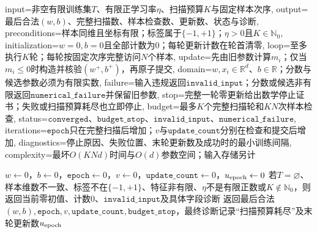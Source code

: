 \begin{AlgorithmContract}{
  input={非空有限训练集$T$、有限正学习率$\eta$、扫描预算$K$与固定样本次序},
  output={最后合法$(w,b)$、完整扫描数、样本检查数、更新数、状态与诊断},
  preconditions={样本同维且坐标有限；标签属于$\{-1,+1\}$；$\eta>0$且$K\in\mathbb N_0$},
  initialization={$w=0,b=0$且全部计数为$0$；每轮更新计数在轮首清零},
  loop={至多执行$K$轮；每轮按固定次序完整访问$N$个样本},
  update={先由旧参数计算$m_i$；仅当$m_i\le0$时构造并核验$(w^+,b^+)$，再原子提交},
  domain={$w,x_i\in\mathbb R^d$、$b\in\mathbb R$；分数与候选参数必须为有限实数},
  failure={输入违规返回$\mathtt{invalid\_input}$；分数或候选非有限返回$\mathtt{numerical\_failure}$并保留旧参数},
  stop={完整一轮零更新给出数学停止证书；失败或扫描预算耗尽也立即停止},
  budget={最多$K$个完整扫描轮和$KN$次样本检查},
  status={$\mathtt{converged}$、$\mathtt{budget\_stop}$、$\mathtt{invalid\_input}$、$\mathtt{numerical\_failure}$},
  iterations={$\mathtt{epoch}$只在完整扫描后增加；$v$与$\mathtt{update\_count}$分别在检查和提交后增加},
  diagnostics={停止原因、失败位置、末轮更新数及成功时的最小训练间隔},
  complexity={最坏$O(KNd)$时间与$O(d)$参数空间；输入存储另计}
}
\begin{algorithm}[H]
\caption{感知机学习算法的原始形式}\label{alg:V2-C01-primal}
$w\leftarrow0$，$b\leftarrow0$，$\mathtt{epoch}\leftarrow0$，$v\leftarrow0$，$\mathtt{update\_count}\leftarrow0$，$u_{\rm epoch}\leftarrow0$\;
若$T=\varnothing$、样本维数不一致、标签不在$\{-1,+1\}$、特征非有限、$\eta$不是有限正数或$K\notin\mathbb N_0$，则返回当前零初值、计数$0$、$\mathtt{invalid\_input}$及具体字段诊断\;
返回最后合法$(w,b),\mathtt{epoch},v,\mathtt{update\_count},\mathtt{budget\_stop}$，最终诊断记录“扫描预算耗尽”及末轮更新数$u_{\rm epoch}$\;
\end{algorithm}
\end{AlgorithmContract}

